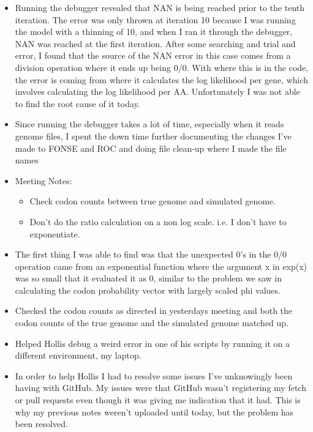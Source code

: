 \documentclass[11pt]{labbook}
\begin{document}
    \begin{itemize}
        \item Running the debugger revealed that NAN is being reached prior to the tenth iteration. The error was only thrown at iteration 10 because I was running the model with a thinning of 10, and when I ran it through the debugger, NAN was reached at the first iteration. After some searching and trial and error, I found that the source of the NAN error in this case comes from a division operation where it ends up being 0/0. With where this is in the code, the error is coming from where it calculates the log likelihood per gene, which involves calculating the log likelihood per AA. Unfortunately I was not able to find the root cause of it today.
        \item Since running the debugger takes a lot of time, especially when it reads genome files, I spent the down time further documenting the changes I've made to FONSE and ROC and doing file clean-up where I made the file names 
    \end{itemize}
    
    \begin{itemize}
        \item Meeting Notes:
            \begin{itemize}
                \item Check codon counts between true genome and simulated genome.
                \item Don't do the ratio calculation on a non log scale. i.e. I don't have to exponentiate.
            \end{itemize}
        \item The first thing I was able to find was that the unexpected 0's in the 0/0 operation came from an exponential function where the argument x in exp(x) was so small that it evaluated it as 0, similar to the problem we saw in calculating the codon probability vector with largely scaled phi values.
    \end{itemize}
    
    \begin{itemize}
        \item Checked the codon counts as directed in yesterdays meeting and both the codon counts of the true genome and the simulated genome matched up.
        \item Helped Hollis debug a weird error in one of his scripts by running it on a different environment, my laptop.
        \item In order to help Hollis I had to resolve some issues I've unknowingly been having with GitHub. My issues were that GitHub wasn't registering my fetch or pull requests even though it was giving me indication that it had. This is why my previous notes weren't uploaded until today, but the problem has been resolved.
    \end{itemize}
\end{document}
